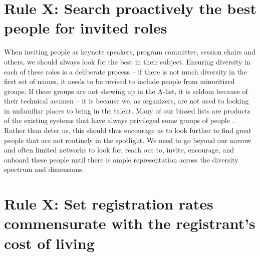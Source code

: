 \documentclass[10pt,letterpaper]{article}
\begin{document}
\section{Rule X: Search proactively the best people for invited roles}

When inviting people as keynote speakers, program committee, session chairs and others, we should always look for the best in their subject. Ensuring diversity in each of these roles is a deliberate process -- if there is not much diversity in the first set of names, it needs to be revised to include people from minoritized groups. If these groups are not showing up in the A-list, it is seldom because of their technical acumen -- it is because we, as organizers, are not used to looking in unfamiliar places to bring in the talent.  Many of our biased lists are products of the existing systems that have always privileged some groups of people \cite{dwyer_notice_2021, sarabipour_evaluating_2020}. Rather than deter us, this should thus encourage us to look further to find great people that are not routinely in the spotlight. We need to go beyond our narrow and often limited networks to look for, reach out to, invite, encourage, and onboard these people until there is ample representation across the diversity spectrum and dimensions. 






\section{Rule X: Set registration rates commensurate with the registrant's cost of living}
\end{document}
